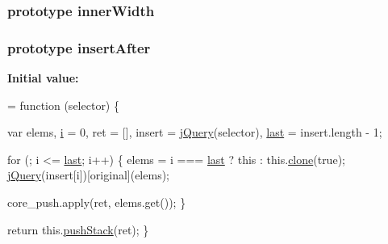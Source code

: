\subsubsection[{\texorpdfstring{inner\+Width}{innerWidth}}]{ {\bf prototype} inner\+Width}\hypertarget{jquery-2_82_81-vsdoc_8js_a903029bceb8e6512b7e550f1ac0efbd2}{}\label{jquery-2_82_81-vsdoc_8js_a903029bceb8e6512b7e550f1ac0efbd2}
\subsubsection[{\texorpdfstring{insert\+After}{insertAfter}}]{ {\bf prototype} insert\+After}\hypertarget{jquery-2_82_81-vsdoc_8js_a6337c8bc3e44ee2285abf58492aed7f2}{}\label{jquery-2_82_81-vsdoc_8js_a6337c8bc3e44ee2285abf58492aed7f2}
{\bfseries Initial value\+:}
\begin{DoxyCode}
= \textcolor{keyword}{function} (selector) \{
        

        var elems,
            \hyperlink{geolocation-marker_8js_a0325b7ce0988782a8032e720ef3aa411}{i} = 0,
            ret = [],
            insert = \hyperlink{jquery-2_82_81-vsdoc_8js_add5237586d970a38a81f990e8eb28c6c}{jQuery}(selector),
            \hyperlink{jquery-2_82_81-vsdoc_8js_a5a9684d230de11a6ec3029bcce128977}{last} = insert.length - 1;

        \textcolor{keywordflow}{for} (; i <= \hyperlink{jquery-2_82_81-vsdoc_8js_a5a9684d230de11a6ec3029bcce128977}{last}; i++) \{
            elems = i === \hyperlink{jquery-2_82_81-vsdoc_8js_a5a9684d230de11a6ec3029bcce128977}{last} ? \textcolor{keyword}{this} : this.\hyperlink{jquery-2_82_81-vsdoc_8js_a7d74ce76585989b4b6e2d506577e13ad}{clone}(\textcolor{keyword}{true});
            \hyperlink{jquery-2_82_81-vsdoc_8js_add5237586d970a38a81f990e8eb28c6c}{jQuery}(insert[i])[original](elems);

            
            core\_push.apply(ret, elems.get());
        \}

        \textcolor{keywordflow}{return} this.\hyperlink{jquery-2_82_81-vsdoc_8js_afc3a7db1ef2b526338c06c07cecccd44}{pushStack}(ret);
    \}
\end{DoxyCode}
